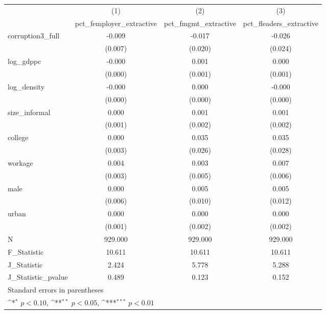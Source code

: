 {
\def\sym#1{\ifmmode^{#1}\else\(^{#1}\)\fi}
\begin{tabular}{l*{3}{c}}
\hline\hline
            &\multicolumn{1}{c}{(1)}&\multicolumn{1}{c}{(2)}&\multicolumn{1}{c}{(3)}\\
            &\multicolumn{1}{c}{pct\_femployer\_extractive}&\multicolumn{1}{c}{pct\_fmgmt\_extractive}&\multicolumn{1}{c}{pct\_fleaders\_extractive}\\
\hline
corruption3\_full&      -0.009         &      -0.017         &      -0.026         \\
            &     (0.007)         &     (0.020)         &     (0.024)         \\
[1em]
log\_gdppc   &      -0.000         &       0.001         &       0.000         \\
            &     (0.000)         &     (0.001)         &     (0.001)         \\
[1em]
log\_density &      -0.000         &       0.000         &      -0.000         \\
            &     (0.000)         &     (0.000)         &     (0.000)         \\
[1em]
size\_informal&       0.000         &       0.001         &       0.001         \\
            &     (0.001)         &     (0.002)         &     (0.002)         \\
[1em]
college     &       0.000         &       0.035         &       0.035         \\
            &     (0.003)         &     (0.026)         &     (0.028)         \\
[1em]
workage     &       0.004         &       0.003         &       0.007         \\
            &     (0.003)         &     (0.005)         &     (0.006)         \\
[1em]
male        &       0.000         &       0.005         &       0.005         \\
            &     (0.006)         &     (0.010)         &     (0.012)         \\
[1em]
urban       &       0.000         &       0.000         &       0.000         \\
            &     (0.001)         &     (0.002)         &     (0.002)         \\
\hline
N           &     929.000         &     929.000         &     929.000         \\
F\_Statistic &      10.611         &      10.611         &      10.611         \\
J\_Statistic &       2.424         &       5.778         &       5.288         \\
J\_Statistic\_pvalue&       0.489         &       0.123         &       0.152         \\
\hline\hline
\multicolumn{4}{l}{\footnotesize Standard errors in parentheses}\\
\multicolumn{4}{l}{\footnotesize \sym{*} \(p<0.10\), \sym{**} \(p<0.05\), \sym{***} \(p<0.01\)}\\
\end{tabular}
}
